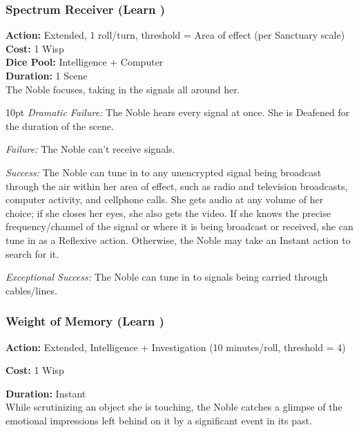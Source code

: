 \subsubsection*{Spectrum Receiver (Learn \textbullet\textbullet)}
\noindent \textbf{Action:} Extended, 1 roll/turn, threshold = Area of effect (per Sanctuary scale)\\
\noindent \textbf{Cost:} 1 Wisp \\
\noindent \textbf{Dice Pool:} Intelligence + Computer\\
\noindent \textbf{Duration:} 1 Scene\\

\noindent The Noble focuses, taking in the signals all around her. 

\begin{myindentpar}{10pt}  \emph{Dramatic Failure:} The Noble hears every signal at once. She is Deafened for the duration of the scene.

\emph{Failure:} The Noble can't receive signals.

\emph{Success:} The Noble can tune in to any unencrypted signal being broadcast through the air within her area of effect, such as radio and television broadcasts, computer activity, and cellphone calls. She gets audio at any volume of her choice; if she closes her eyes, she also gets the video. If she knows the precise frequency/channel of the signal or where it is being broadcast or received, she can tune in as a Reflexive action. Otherwise, the Noble may take an Instant action to search for it.

\emph{Exceptional Success:} The Noble can tune in to signals being carried through cables/lines.\end{myindentpar}

\subsubsection*{Weight of Memory (Learn \textbullet\textbullet)}

\noindent \textbf{Action:} Extended, Intelligence + Investigation (10 minutes/roll, threshold = 4) 

\noindent \textbf{Cost:} 1 Wisp 

\noindent \textbf{Duration:} Instant \\

While scrutinizing an object she is touching, the Noble catches a glimpse of the emotional impressions left behind on it by a significant event in its past. 

